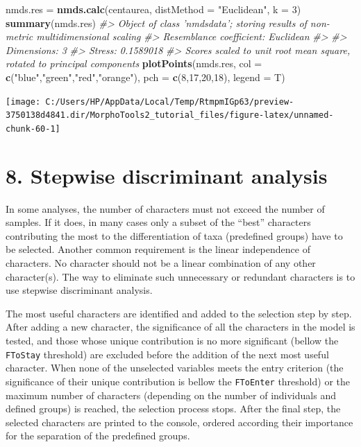 \documentclass[
]{article}
\newenvironment{Shaded}{\begin{snugshade}}{\end{snugshade}}
\newcommand{\CommentTok}[1]{\textcolor[rgb]{0.56,0.35,0.01}{\textit{#1}}}
\newcommand{\DataTypeTok}[1]{\textcolor[rgb]{0.13,0.29,0.53}{#1}}
\newcommand{\DecValTok}[1]{\textcolor[rgb]{0.00,0.00,0.81}{#1}}
\newcommand{\KeywordTok}[1]{\textcolor[rgb]{0.13,0.29,0.53}{\textbf{#1}}}
\newcommand{\NormalTok}[1]{#1}
\newcommand{\StringTok}[1]{\textcolor[rgb]{0.31,0.60,0.02}{#1}}
\begin{document}
\begin{Shaded}
\begin{Highlighting}[]
\NormalTok{nmds.res =}\StringTok{ }\KeywordTok{nmds.calc}\NormalTok{(centaurea, }\DataTypeTok{distMethod =} \StringTok{"Euclidean"}\NormalTok{, }\DataTypeTok{k =} \DecValTok{3}\NormalTok{)}
\KeywordTok{summary}\NormalTok{(nmds.res)}
\CommentTok{#> Object of class 'nmdsdata'; storing results of non-metric multidimensional scaling}
\CommentTok{#> Resemblance coefficient:  Euclidean }
\CommentTok{#> }
\CommentTok{#> Dimensions:  3}
\CommentTok{#> Stress:  0.1589018}
\CommentTok{#> Scores scaled to unit root mean square, rotated to principal components}
\KeywordTok{plotPoints}\NormalTok{(nmds.res, }\DataTypeTok{col =} \KeywordTok{c}\NormalTok{(}\StringTok{"blue"}\NormalTok{,}\StringTok{"green"}\NormalTok{,}\StringTok{"red"}\NormalTok{,}\StringTok{"orange"}\NormalTok{), }\DataTypeTok{pch =} \KeywordTok{c}\NormalTok{(}\DecValTok{8}\NormalTok{,}\DecValTok{17}\NormalTok{,}\DecValTok{20}\NormalTok{,}\DecValTok{18}\NormalTok{), }
            \DataTypeTok{legend =}\NormalTok{ T)}
\end{Highlighting}
\end{Shaded}

\begin{center}\texttt{[image: C:/Users/HP/AppData/Local/Temp/RtmpmIGp63/preview-3750138d4841.dir/MorphoTools2\_tutorial\_files/figure-latex/unnamed-chunk-60-1]} \end{center}

\newpage

\hypertarget{stepwise-discriminant-analysis}{%
\section{8. Stepwise discriminant
analysis}\label{stepwise-discriminant-analysis}}

In some analyses, the number of characters must not exceed the number of
samples. If it does, in many cases only a subset of the ``best''
characters contributing the most to the differentiation of taxa
(predefined groups) have to be selected. Another common requirement is
the linear independence of characters. No character should not be a
linear combination of any other character(s). The way to eliminate such
unnecessary or redundant characters is to use stepwise discriminant
analysis.

The most useful characters are identified and added to the selection
step by step. After adding a new character, the significance of all the
characters in the model is tested, and those whose unique contribution
is no more significant (bellow the \texttt{FToStay} threshold) are
excluded before the addition of the next most useful character. When
none of the unselected variables meets the entry criterion (the
significance of their unique contribution is bellow the
\texttt{FToEnter} threshold) or the maximum number of characters
(depending on the number of individuals and defined groups) is reached,
the selection process stops. After the final step, the selected
characters are printed to the console, ordered according their
importance for the separation of the predefined groups.
\end{document}
